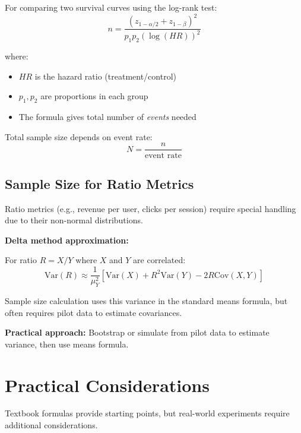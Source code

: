 \begin{theorem}
For comparing two survival curves using the log-rank test:
\begin{equation}
n = \frac{(z_{1-\alpha/2} + z_{1-\beta})^2}{p_1 p_2 (\log(HR))^2}
\end{equation}

where:
\begin{itemize}
    \item $HR$ is the hazard ratio (treatment/control)
    \item $p_1, p_2$ are proportions in each group
    \item The formula gives total number of \textit{events} needed
\end{itemize}

Total sample size depends on event rate:
\begin{equation}
N = \frac{n}{\text{event rate}}
\end{equation}
\end{theorem}

\subsection{Sample Size for Ratio Metrics}

Ratio metrics (e.g., revenue per user, clicks per session) require special handling due to their non-normal distributions.

\textbf{Delta method approximation:}

For ratio $R = X/Y$ where $X$ and $Y$ are correlated:
\begin{equation}
\text{Var}(R) \approx \frac{1}{\mu_Y^2}\left[\text{Var}(X) + R^2\text{Var}(Y) - 2R\text{Cov}(X,Y)\right]
\end{equation}

Sample size calculation uses this variance in the standard means formula, but often requires pilot data to estimate covariances.

\textbf{Practical approach:} Bootstrap or simulate from pilot data to estimate variance, then use means formula.

\section{Practical Considerations}

Textbook formulas provide starting points, but real-world experiments require additional considerations.

